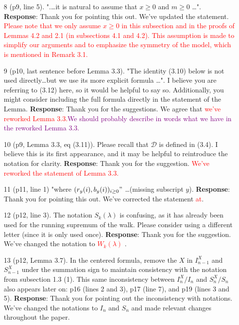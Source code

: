 \documentclass[11pt,a4paper]{article}
\numberwithin{equation}{section}
\newcommand{\edt}[1]{\textcolor{purple}{#1}} %
\def\TBF#1{\textcolor{red}{#1}} %
\begin{document}
\begin{itemize}
		
		
		\item[8] (p9, line 5). ".\dots it is natural to assume that $x \geq 0$ and $m \geq 0$ \dots".
		\subitem \textbf{Response}:  Thank you for pointing this out.  We've updated the statement. \TBF{Please note that we only assume $x\geq 0$ in this subsection and in the proofs of Lemmas 4.2 and 2.1 (in subsections 4.1 and 4.2). This assumption is made to simplify our arguments and to emphasize the symmetry of the model, which is mentioned in Remark 3.1.}
		
		\item [9] (p10, last sentence before Lemma 3.3). "The identity (3.10) below is not used directly\dots but we use its more explicit formula \dots ". I believe you are referring to (3.12) here, so it would be helpful to say so. Additionally, you might consider including the full formula directly in the statement of the Lemma.
		\subitem \textbf{Response}: Thank you for the suggestions. We agree that \TBF{we've reworked Lemma 3.3.}\edt{We should probably describe in words what we have in the reworked Lemma 3.3.}
		
		\item [10] (p9, Lemma 3.3, eq (3.11)). Please recall that $\mathcal{D}$ is defined in (3.4). I believe this is its first appearance, and it may be helpful to reintroduce the notation for clarity.
		\subitem \textbf{Response}:  Thank you for the suggestion. \TBF{ We've reworked the statement of Lemma 3.3. }
		
		
		
		\item [11] (p11, line 1) "where $(r_y(i),b_y(i))_{i\geq 0}"$ \dots (missing subscript $y$).
		\subitem \textbf{Response}:  Thank you for pointing this out.  We've corrected the statement \TBF{at}.
		
		
		\item[12] (p12, line 3). The notation $S_k(\lambda)$ is confusing, as it has already been used for the running supremum of the walk. Please consider using a different letter (since it is only used once).
		\subitem \textbf{Response}:  Thank you for the suggestion.  We've changed the notation to \TBF{${W}_k(\lambda) $} .
		
		
		\item[13] (p12, Lemma 3.7). In the centered formula, remove the $X$ in $I^X_{n-1}$
		and $S^X_{n-1}$ under the summation sign to maintain consistency with the notation from subsection 1.3 (1). This same inconsistency between $I^X_n /I_n$ and $S^X_n/S_n$ also appears later on: p16 (lines 2 and 3), p17 (line 7), and p19 (lines 3 and 5).
		\subitem \textbf{Response}:  Thank you for pointing out the inconsistency with notations.  We've changed the notations to $I_n$ and $S_n$ and made relevant changes throughout the paper.
		

\end{itemize}
\end{document}
